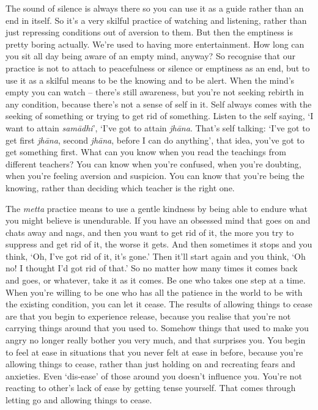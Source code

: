 The sound of silence is always there so you can use it as a guide rather than an end in itself. So it's a very skilful practice of watching and listening, rather than just repressing conditions out of aversion to them. But then the emptiness is pretty boring actually. We're used to having more entertainment. How long can you sit all day being aware of an empty mind, anyway? So recognise that our practice is not to attach to peacefulness or silence or emptiness as an end, but to use it as a skilful means to be the knowing and to be alert. When the mind's empty you can watch -- there's still awareness, but you're not seeking rebirth in any condition, because there's not a sense of self in it. Self always comes with the seeking of something or trying to get rid of something. Listen to the self saying, `I want to attain \textit{sam\=adhi}', `I've got to attain \textit{jh\=ana}. That's self talking: `I've got to get first \textit{jh\=ana}, second \textit{jh\=ana}, before I can do anything', that idea, you've got to get something first. What can you know when you read the teachings from different teachers? You can know when you're confused, when you're doubting, when you're feeling aversion and suspicion. You can know that you're being the knowing, rather than deciding which teacher is the right one.

The \textit{metta} practice means to use a gentle kindness by being able to endure what you might believe is unendurable. If you have an obsessed mind that goes on and chats away and nags, and then you want to get rid of it, the more you try to suppress and get rid of it, the worse it gets. And then sometimes it stops and you think, `Oh, I've got rid of it, it's gone.' Then it'll start again and you think, `Oh no! I thought I'd got rid of that.' So no matter how many times it comes back and goes, or whatever, take it as it comes. Be one who takes one step at a time. When you're willing to be one who has all the patience in the world to be with the existing condition, you can let it cease. The results of allowing things to cease are that you begin to experience release, because you realise that you're not carrying things around that you used to. Somehow things that used to make you angry no longer really bother you very much, and that surprises you. You begin to feel at ease in situations that you never felt at ease in before, because you're allowing things to cease, rather than just holding on and recreating fears and anxieties. Even `dis-ease' of those around you doesn't influence you. You're not reacting to other's lack of ease by getting tense yourself. That comes through letting go and allowing things to cease.

